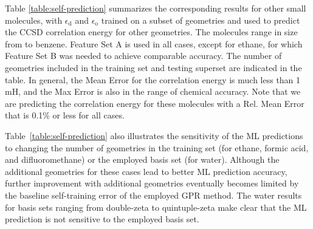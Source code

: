 \documentclass[%
 aps,
 prb,
 twocolumn,
%
 reprint,%
%
citeautoscript,
%
showkeys
]{revtex4-1}
\begin{document}
%


 
%
%
 
%
 
%
%
%
%

%
Table \ref{table:self-prediction}  summarizes the corresponding results for %
other small molecules, with $\epsilon_{\textrm{d}}$ and $\epsilon_{\textrm{o}}$ trained on a subset of geometries and used to predict the CCSD correlation energy for other geometries.  
The molecules %
range in size from  to benzene.
Feature Set A is used in all cases, except for ethane, for which Feature Set B was needed to achieve comparable accuracy. The number of geometries included in the training set and testing superset are indicated in the table. 
In general, the Mean Error for the correlation energy is much less than 1 mH, and the Max Error is also in the range of chemical accuracy. 
Note that we are predicting the correlation energy for these molecules with a Rel. Mean Error that is  0.1\% or less for all cases. 


Table~\ref{table:self-prediction} also illustrates the sensitivity of the ML predictions to changing the number of geometries in the training set (for ethane, formic acid, and difluoromethane) or the employed basis set (for water). 
Although the additional geometries for these cases lead to better ML prediction accuracy, further improvement with additional geometries eventually becomes limited by the baseline self-training error of the employed GPR method. %
The water results for basis sets ranging from double-zeta to quintuple-zeta make clear that the ML prediction is not sensitive to the employed basis set.
%


%
%
%
%



%
%
\end{document}
